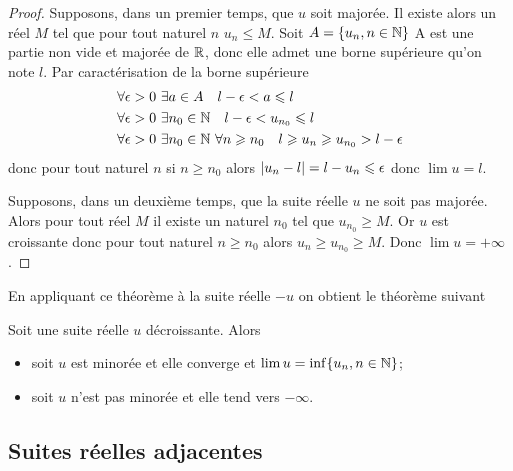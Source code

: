 \begin{proof}
  Supposons, dans un premier temps, que \(u\) soit majorée. Il existe alors un réel \(M\) tel que pour tout naturel \(n\) \(u_n \leqslant M\). Soit \(A=\{u_n, n \in \mathbb{N}\}\) A est une partie non vide et majorée de \(\mathbb{R}\), donc elle admet une borne supérieure qu'on note \(l\). Par caractérisation de la borne supérieure
  \begin{align}
      \forall \epsilon > 0 & \ \exists a \in A \quad l-\epsilon < a \leqslant l \\
      \forall \epsilon > 0 & \ \exists n_0 \in \mathbb{N} \quad l-\epsilon < u_{n_0} \leqslant l \\
      \forall \epsilon > 0 & \ \exists n_0 \in \mathbb{N} \ \forall n \geqslant n_0 \quad l \geqslant u_n \geqslant u_{n_0} > l-\epsilon
  \end{align}
donc pour tout naturel \(n\) si \(n \geqslant n_0\) alors \(\left\lvert u_n-l\right\rvert=l-u_n \leqslant \epsilon\) donc \(\lim u =l\).

Supposons, dans un deuxième temps, que la suite réelle \(u\) ne soit pas majorée. Alors pour tout réel \(M\) il existe un naturel \(n_0\) tel que \(u_{n_0} \geqslant M\). Or \(u\) est croissante donc pour tout naturel \(n \geqslant n_0\) alors \(u_n \geqslant u_{n_0} \geqslant M\). Donc \(\lim u =+\infty\).
\end{proof}
En appliquant ce théorème à la suite réelle \(-u\) on obtient le théorème suivant
\begin{theo}
  Soit une suite réelle \(u\) décroissante. Alors
  \begin{itemize}
  \item soit \(u\) est minorée et elle converge et \(\lim u = \inf\{u_n, n \in \mathbb{N}\}\);
  \item soit \(u\) n'est pas minorée et elle tend vers \(-\infty\).
  \end{itemize}
\end{theo}

\subsection{Suites réelles adjacentes}

